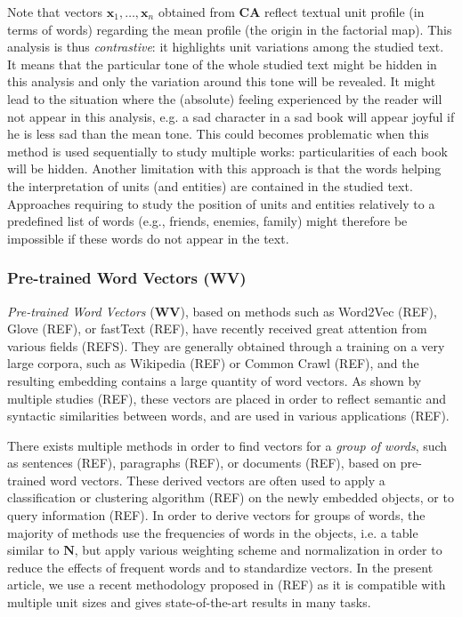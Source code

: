 \documentclass[
twocolumn,
]{ceurart}
\begin{document}
Note that vectors $\mathbf{x}_1, \ldots, \mathbf{x}_n$ obtained from \textbf{CA} reflect textual unit profile (in terms of words) regarding the mean profile (the origin in the factorial map). This analysis is thus \emph{contrastive}: it highlights unit variations among the studied text. It means that the particular tone of the whole studied text might be hidden in this analysis and only the variation around this tone will be revealed. It might lead to the situation where the (absolute) feeling experienced by the reader will not appear in this analysis, e.g. a sad character in a sad book will appear joyful if he is less sad than the mean tone. This could becomes problematic when this method is used sequentially to study multiple works: particularities of each book will be hidden. Another limitation with this approach is that the words helping the interpretation of units (and entities) are contained in the studied text. Approaches requiring to study the position of units and entities relatively to a predefined list of words (e.g., friends, enemies, family) might therefore be impossible if these words do not appear in the text.

\subsubsection{Pre-trained Word Vectors (WV)}
\label{wv_method}

\emph{Pre-trained Word Vectors}$  $ (\textbf{WV}), based on methods such as Word2Vec (REF), Glove (REF), or fastText (REF), have recently received great attention from various fields (REFS). They are generally obtained through a training on a very large corpora, such as Wikipedia (REF) or Common Crawl (REF), and the resulting embedding contains a large quantity of word vectors. As shown by multiple studies (REF), these vectors are placed in order to reflect semantic and syntactic similarities between words, and are used in various applications (REF). 

There exists multiple methods in order to find vectors for a \emph{group of words}, such as sentences (REF), paragraphs (REF), or documents (REF), based on pre-trained word vectors. These derived vectors are often used to apply a classification or clustering algorithm  (REF) on the newly embedded objects, or to query information (REF). In order to derive vectors for groups of words, the majority of methods use the frequencies of words in the objects, i.e. a table similar to $\mathbf{N}$, but apply various weighting scheme and normalization in order to reduce the effects of frequent words and to standardize vectors. In the present article, we use a recent methodology proposed in (REF) as it is compatible with multiple unit sizes and gives state-of-the-art results in many tasks. 
\end{document}
